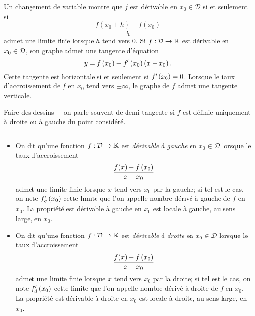 \documentclass{magnolia}
\begin{document}
\begin{remarques}
\remarque Un changement de variable montre que $f$ est dérivable en $x_0\in\mathcal{D}$
  si et seulement si
  \[\frac{f(x_0+h)-f(x_0)}{h}\]
  admet une limite finie lorsque $h$ tend vers $0$.
\remarque Si $f:\mathcal{D}\to\mathbb{R}$ est dérivable en $x_0\in\mathcal{D}$, son graphe admet une tangente
  d'équation
  \[y=f\left(x_0\right)+f'\left(x_0\right)\left(x-x_0\right).\]
  Cette tangente est horizontale si et seulement si $f'\left(x_0\right)=0$.
  Lorsque le taux d'accroissement de $f$ en $x_0$ tend vers
  $\pm\infty$, le graphe de $f$ admet une tangente verticale.
  \begin{sol}
  Faire des dessins + on parle souvent de demi-tangente si $f$ est définie uniquement à droite ou à gauche du point considéré.
  \end{sol}
\end{remarques}

\begin{definition}[utile=-3]
$\quad$
\begin{itemize}
\item On dit qu'une fonction $f:\mathcal{D}\to\mathbb{K}$ est \emph{dérivable à gauche} en $x_0\in\mathcal{D}$
  lorsque le taux d'accroissement
  \[\frac{f(x)-f\left(x_0\right)}{x-x_0}\]
  admet une limite finie lorsque $x$ tend vers $x_0$ par la gauche; si tel est le cas,
  on note $f_g'\left(x_0\right)$ cette limite que l'on appelle nombre dérivé à gauche de $f$
  en $x_0$. La propriété \og est dérivable à gauche en $x_0$ \fg est locale à
  gauche, au sens large, en $x_0$.
\item On dit qu'une fonction $f:\mathcal{D}\to\mathbb{K}$ est \emph{dérivable à droite} en $x_0\in\mathcal{D}$
  lorsque le taux d'accroissement
  \[\frac{f(x)-f\left(x_0\right)}{x-x_0}\]
  admet une limite finie lorsque $x$ tend vers $x_0$ par la droite; si tel est le cas,
  on note $f_d'\left(x_0\right)$ cette limite que l'on appelle nombre dérivé à droite de $f$
  en $x_0$. La propriété \og est dérivable à droite en $x_0$ \fg est locale à
  droite, au sens large, en $x_0$.
\end{itemize}
\end{definition}
\end{document}

